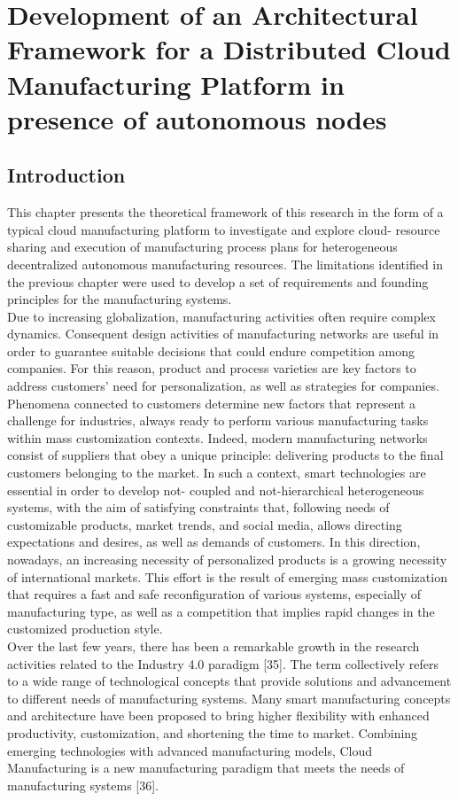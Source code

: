 \chapter{Development of an Architectural Framework for a Distributed Cloud Manufacturing Platform in presence of autonomous nodes}
\section{Introduction}
This chapter presents the theoretical framework of this research in the form of a typical cloud manufacturing platform to investigate and explore cloud- resource sharing and execution of manufacturing process plans for heterogeneous decentralized autonomous manufacturing resources. The limitations identified in the previous chapter were used to develop a set of requirements and founding principles for the manufacturing systems.\\
Due to increasing globalization, manufacturing activities often require complex dynamics. Consequent design activities of manufacturing networks are useful in order to guarantee suitable decisions that could endure competition among companies. For this reason, product and process varieties are key factors to address customers' need for personalization, as well as strategies for companies. Phenomena connected to customers determine new factors that represent a challenge for industries, always ready to perform various manufacturing tasks within mass customization contexts. Indeed, modern manufacturing networks consist of suppliers that obey a unique principle: delivering products to the final customers belonging to the market. In such a context, smart technologies are essential in order to develop not- coupled and not-hierarchical heterogeneous systems, with the aim of satisfying constraints that, following needs of customizable products, market trends, and social media, allows directing expectations and desires, as well as demands of customers. In this direction, nowadays, an increasing necessity of personalized products is a growing necessity of international markets. This effort is the result of emerging mass customization that requires a fast and safe reconfiguration of various systems, especially of manufacturing type, as well as a competition that implies rapid changes in the customized production style.\\
Over the last few years, there has been a remarkable growth in the research activities related to the Industry 4.0 paradigm [35]. The term collectively refers to a wide range of technological concepts that provide solutions and advancement to different needs of manufacturing systems. Many smart manufacturing concepts and architecture have been proposed to bring higher flexibility with enhanced productivity, customization, and shortening the time to market. Combining emerging technologies with advanced manufacturing models, Cloud Manufacturing is a new manufacturing paradigm that meets the needs of manufacturing systems [36].\\
